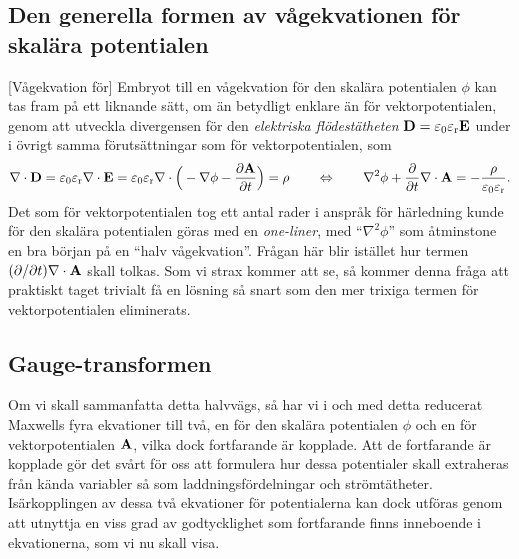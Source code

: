 {{{{{{\subsection{Den generella formen av v{\aa}gekvationen f{\"o}r skal{\"a}ra
  potentialen}
[V{\aa}gekvation f{\"o}r]
Embryot till en v{\aa}gekvation f{\"o}r den skal{\"a}ra potentialen $\phi$ kan
tas fram p{\aa} ett liknande s{\"a}tt, om {\"a}n betydligt enklare {\"a}n
f{\"o}r vektorpotentialen, genom att utveckla divergensen f{\"o}r den
{\it elektriska fl{\"o}dest{\"a}theten} ${\bf D}=\varepsilon_0\varepsilon_{\rm r}
{\bf E}$ under i {\"o}vrigt samma f{\"o}ruts{\"a}ttningar som f{\"o}r
vektorpotentialen, som
$$
  \nabla\cdot{\bf D}
    =\varepsilon_0\varepsilon_{\rm r}\nabla\cdot{\bf E}
    =\varepsilon_0\varepsilon_{\rm r}\nabla\cdot
        \Big(-\nabla\phi-{{\partial{\bf A}}\over{\partial t}}\Big)
    =\rho
  \qquad\Leftrightarrow\qquad
    \nabla^2\phi+{{\partial}\over{\partial t}}\nabla\cdot{\bf A}
    =-{{\rho}\over{\varepsilon_0\varepsilon_{\rm r}}}.
$$
Det som f{\"o}r vektorpotentialen tog ett antal rader i anspr{\aa}k f{\"o}r
h{\"a}rledning kunde f{\"o}r den skal{\"a}ra potentialen g{\"o}ras med en
{\it one-liner}, med ``$\nabla^2\phi$'' som {\aa}tminstone en bra b{\"o}rjan
p{\aa} en ``halv v{\aa}gekvation''.
Fr{\aa}gan h{\"a}r blir ist{\"a}llet hur termen $({{\partial}/{\partial t}})
\nabla\cdot{\bf A}$ skall tolkas.
Som vi strax kommer att se, s{\aa} kommer denna fr{\aa}ga att praktiskt taget
trivialt f{\aa} en l{\"o}sning s{\aa} snart som den mer trixiga termen f{\"o}r
vektorpotentialen eliminerats.

\subsection{Gauge-transformen}
Om vi skall sammanfatta detta halvv{\"a}gs, s{\aa} har vi i och med detta
reducerat Maxwells fyra ekvationer till tv{\aa}, en f{\"o}r den skal{\"a}ra
potentialen $\phi$ och en f{\"o}r vektorpotentialen ${\bf A}$, vilka dock
fortfarande {\"a}r kopplade. Att de fortfarande {\"a}r kopplade g{\"o}r det
sv{\aa}rt f{\"o}r oss att formulera hur dessa potentialer skall extraheras
fr{\aa}n k{\"a}nda variabler s{\aa} som laddningsf{\"o}rdelningar och
str{\"o}mt{\"a}theter.
Is{\"a}rkopplingen av dessa tv{\aa} ekvationer f{\"o}r potentialerna kan dock
utf{\"o}ras genom att utnyttja en viss grad av godtycklighet som fortfarande
finns inneboende i ekvationerna, som vi nu skall visa.

}}}}}}
